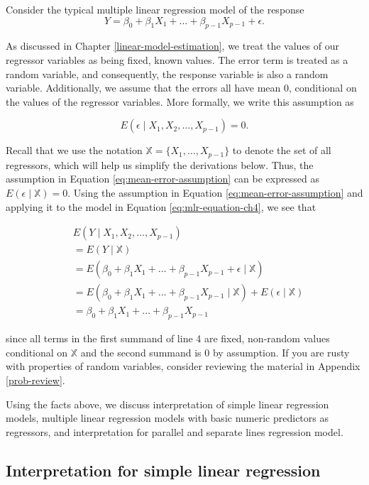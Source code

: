 \documentclass[
]{book}
\theoremstyle{definition}
\theoremstyle{definition}
\theoremstyle{definition}
\theoremstyle{definition}
\theoremstyle{remark}
\begin{document}
Consider the typical multiple linear regression model of the response \[
Y=\beta_0+\beta_1 X_1 +\ldots + \beta_{p-1}X_{p-1}+\epsilon.\label{eq:mlr-equation-ch4}
\]

As discussed in Chapter \ref{linear-model-estimation}, we treat the
values of our regressor variables as being fixed, known values. The
error term is treated as a random variable, and consequently, the
response variable is also a random variable. Additionally, we assume
that the errors all have mean 0, conditional on the values of the
regressor variables. More formally, we write this assumption as

\[
E(\epsilon \mid X_1, X_2, \ldots, X_{p-1})=0.\label{eq:mean-error-assumption}
\]

Recall that we use the notation \(\mathbb{X} = \{X_1,\ldots,X_{p-1}\}\) to
denote the set of all regressors, which will help us simplify the
derivations below. Thus, the assumption in Equation
\eqref{eq:mean-error-assumption} can be expressed as
\(E(\epsilon \mid \mathbb{X})=0\). Using the assumption in Equation
\eqref{eq:mean-error-assumption} and applying it to the model in Equation
\eqref{eq:mlr-equation-ch4}, we see that

\[
\begin{aligned}
& E(Y\mid X_1, X_2, \ldots, X_{p-1}) \\
&= E(Y \mid \mathbb{X}) \\
&= E(\beta_0+\beta_1 X_1 +\ldots + \beta_{p-1}X_{p-1}+\epsilon \mid \mathbb{X}) \\
&= E(\beta_0+\beta_1 X_1 +\ldots + \beta_{p-1}X_{p-1}\mid \mathbb{X}) + E(\epsilon \mid \mathbb{X}) \\
&=\beta_0+\beta_1 X_1 +\ldots + \beta_{p-1}X_{p-1}
\end{aligned}
\]

since all terms in the first summand of line 4 are fixed, non-random
values conditional on \(\mathbb{X}\) and the second summand is 0 by
assumption. If you are rusty with properties of random variables,
consider reviewing the material in Appendix \ref{prob-review}.

Using the facts above, we discuss interpretation of simple linear
regression models, multiple linear regression models with basic numeric
predictors as regressors, and interpretation for parallel and separate
lines regression model.

\hypertarget{interpretation-for-simple-linear-regression}{%
\subsection{Interpretation for simple linear regression}\label{interpretation-for-simple-linear-regression}}
\end{document}
